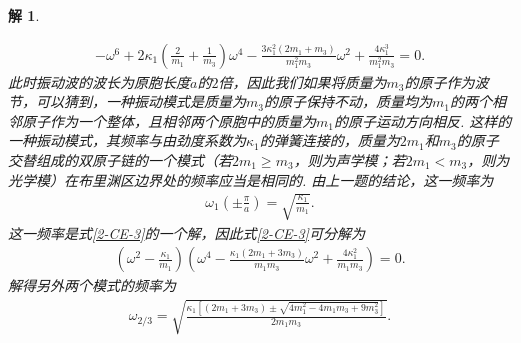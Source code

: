 \documentclass[UTF8,10pt,a4paper]{article}
\theoremstyle{Problem}
\theoremstyle{Solution}
\newtheorem*{sol}{解}
\begin{document}
\begin{sol}
\begin{enumerate}
        \begin{align}
            \label{2-CE-3}
            -\omega^6+2\kappa_1\left(\frac{2}{m_1}+\frac{1}{m_3}\right)\omega^4-\frac{3\kappa_1^2(2m_1+m_3)}{m_1^2m_3}\omega^2+\frac{4\kappa_1^3}{m_1^2m_3}=0.
        \end{align}
        此时振动波的波长为原胞长度$a$的$2$倍，因此我们如果将质量为$m_3$的原子作为波节，可以猜到，一种振动模式是质量为$m_3$的原子保持不动，质量均为$m_1$的两个相邻原子作为一个整体，且相邻两个原胞中的质量为$m_1$的原子运动方向相反. 这样的一种振动模式，其频率与由劲度系数为$\kappa_1$的弹簧连接的，质量为$2m_1$和$m_3$的原子交替组成的双原子链的一个模式（若$2m_1\geq m_3$，则为声学模；若$2m_1<m_3$，则为光学模）在布里渊区边界处的频率应当是相同的. 由上一题的结论，这一频率为
        \begin{align}
            \omega_1(\pm\frac{\pi}{a})=\sqrt{\frac{\kappa_1}{m_1}}.
        \end{align}
        这一频率是式\eqref{2-CE-3}的一个解，因此式\eqref{2-CE-3}可分解为
        \begin{align}
            \left(\omega^2-\frac{\kappa_1}{m_1}\right)\left(\omega^4-\frac{\kappa_1(2m_1+3m_3)}{m_1m_3}\omega^2+\frac{4\kappa_1^2}{m_1m_3}\right)=0.
        \end{align}
        解得另外两个模式的频率为
        \begin{align}
            \omega_{2/3}=\sqrt{\frac{\kappa_1\left[(2m_1+3m_3)\pm\sqrt{4m_1^2-4m_1m_3+9m_3^2}\right]}{2m_1m_3}}.
        \end{align}
    \end{enumerate}
\end{sol}
\end{document}
